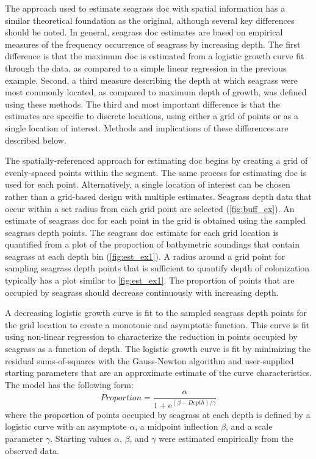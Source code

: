 \documentclass[letterpaper,12pt,oneside]{article}\usepackage[]{graphicx}\usepackage[]{color}
\begin{document}
The approach used to estimate seagrass \ac{doc} with spatial information has a similar theoretical foundation as the original, although several key differences should be noted.  In general, seagrass \ac{doc} estimates are based on empirical measures of the frequency occurrence of seagrass by increasing depth.  The first difference is that the maximum \ac{doc} is estimated from a logistic growth curve fit through the data, as compared to a simple linear regression in the previous example.  Second, a third measure describing the depth at which seagrass were most commonly located, as compared to maximum depth of growth, was defined using these methods.  The third and most important difference is that the estimates are specific to discrete locations, using either a grid of points or as a single location of interest. Methods and implications of these differences are described below.                                   

The spatially-referenced approach for estimating \ac{doc} begins by creating a grid of evenly-spaced points within the segment.  The same process for estimating \ac{doc} is used for each point.  Alternatively, a single location of interest can be chosen rather than a grid-based design with multiple estimates.  Seagrass depth data that occur within a set radius from each grid point are selected (\cref{fig:buff_ex}).  An estimate of seagrass \ac{doc} for each point in the grid is obtained using the sampled seagrass depth points.  The seagrass \ac{doc} estimate for each grid location is quantified from a plot of the proportion of bathymetric soundings that contain seagrass at each depth bin (\cref{fig:est_ex1}).  A radius around a grid point for sampling seagrass depth points that is sufficient to quantify depth of colonization typically has a plot similar to \cref{fig:est_ex1}.  The proportion of points that are occupied by seagrass should decrease continuously with increasing depth.  

A decreasing logistic growth curve is fit to the sampled seagrass depth points for the grid location to create a monotonic and asymptotic function.  This curve is fit using non-linear regression to characterize the reduction in points occupied by seagrass as a function of depth.  The logistic growth curve is fit by minimizing the residual sums-of-squares with the Gauss-Newton algorithm \citep{Bates92} and user-supplied starting parameters that are an approximate estimate of the curve characteristics.  The model has the following form:
\begin{equation}
 Proportion = \frac{\alpha}{1 + \mathrm{e}^{{\left(\beta - Depth\right)/\gamma}}}
\end{equation}
where the proportion of points occupied by seagrass at each depth is defined by a logistic curve with an asymptote $\alpha$, a midpoint inflection $\beta$, and a scale parameter $\gamma$.  Starting values $\alpha$, $\beta$, and $\gamma$ were estimated empirically from the observed data.  
\end{document}
